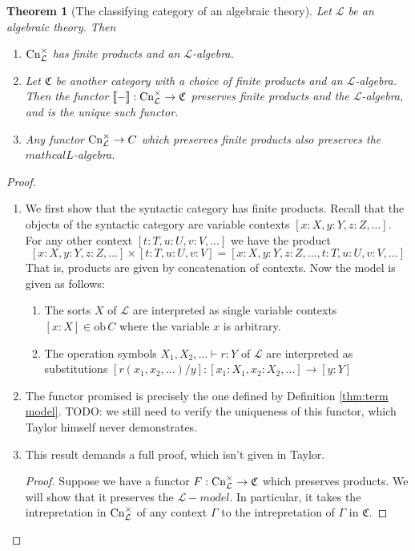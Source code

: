 \documentclass[12pt,twoside]{reedthesis}
\theoremstyle{definition}
\theoremstyle{remark}
\theoremstyle{plain}
\newtheorem{theorem}{Theorem}
\begin{document}
\begin{theorem}[The classifying category of an algebraic
  theory]\label{thm:classifying alg theory} Let \( \mathcal{L} \) be an
  algebraic theory. Then \begin{enumerate}
    \item $\mathrm{Cn}_\mathcal{L}^{\times}$ has finite products and an $\mathcal{L}$-algebra.
    \item Let $\mathfrak{C}$ be another category with a choice of finite
    products and an $\mathcal{L}$-algebra. Then the functor $\llbracket-\rrbracket :
    \mathrm{Cn}_{\mathcal{L}}^{\times} \rightarrow \mathfrak{C}$ preserves finite
    products and the $\mathcal{L}$-algebra, and is the unique such functor.
    \item Any functor \( \mathrm{Cn}_{\mathcal{L}}^{\times} \rightarrow C \) which
    preserves finite products also preserves the $mathcal{L}$-algebra.
  \end{enumerate}
\end{theorem}
\newcommand{\ob}{\mathrm{ob}\,}
\begin{proof}\,\\
  \begin{enumerate}
    \item We first show that the syntactic category has finite products. Recall
    that the objects of the syntactic category are variable contexts \([x : X, y
    : Y, z : Z, \dots]\). For any other context \( [t : T, u : U, v : V, \dots]
    \) we have the product \[ [x : X, y : Y, z : Z, \dots] \times [t : T, u : U,
    v : V] = [x : X, y : Y, z : Z, \dots, t : T, u : U, v : V, \dots]\] That
    is, products are given by concatenation of contexts. Now the model is given
    as follows:
    \begin{enumerate}
      \item The sorts $X$ of $\mathcal{L}$ are interpreted as single variable
      contexts $[x:X] \in \ob C$ where the variable $x$ is arbitrary.
      \item The operation symbols \( X_1, X_2, \dots \vdash r : Y \) of
      $\mathcal{L}$ are interpreted as substitutions \( [r(x_1, x_2, \dots)/y] :
      [x_1:X_1, x_2:X_2,\dots] \rightarrow [y : Y]\) 
    \end{enumerate}
    \item The functor promised is precisely the one defined by Definition
          \ref{thm:term model}. TODO: we still need to verify the uniqueness of
          this functor, which Taylor himself never demonstrates.
          \item This result demands a full proof, which isn't given in Taylor.
          \begin{proof}
            Suppose we have a functor $F : \mathrm{Cn}_{\mathcal{L}}^{\times} \rightarrow \mathfrak{C}$
            which preserves products. We will show that it preserves the
            $\mathcal{L}-model$. In particular, it takes the intrepretation in
            $\mathrm{Cn}_{\mathcal{L}}^{\times}$ of any context $\Gamma$ to the intrepretation of
            $\Gamma$ in $\mathfrak{C}$.
          \end{proof}

  \end{enumerate}
\end{proof}
\end{document}

